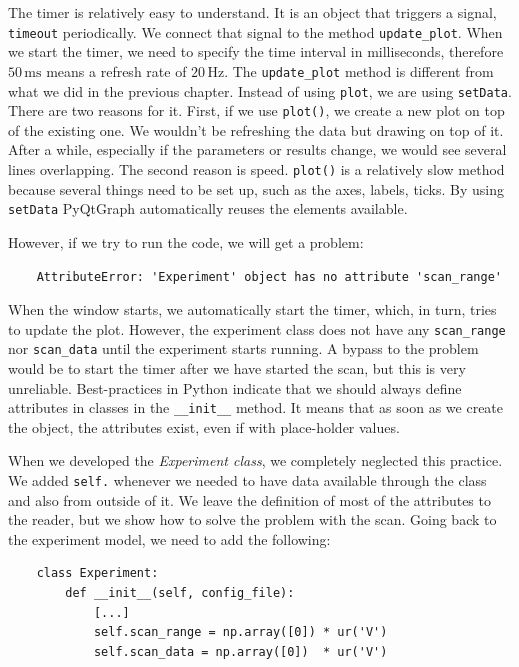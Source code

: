 The timer is relatively easy to understand. It is an object that triggers a signal, \texttt{timeout} periodically. We connect that signal to the method \texttt{update\_plot}. When we start the timer, we need to specify the time interval in milliseconds, therefore $50\,\textrm{ms}$ means a refresh rate of $20\,\textrm{Hz}$. The \texttt{update\_plot} method is different from what we did in the previous chapter. Instead of using \texttt{plot}, we are using \texttt{setData}. There are two reasons for it. First, if we use \texttt{plot()}, we create a new plot on top of the existing one. We wouldn't be refreshing the data but drawing on top of it. After a while, especially if the parameters or results change, we would see several lines overlapping. The second reason is speed. \texttt{plot()} is a relatively slow method because several things need to be set up, such as the axes, labels, ticks. By using \texttt{setData} PyQtGraph automatically reuses the elements available.

However, if we try to run the code, we will get a problem:

\begin{verbatim}
    AttributeError: 'Experiment' object has no attribute 'scan_range'
\end{verbatim}


When the window starts, we automatically start the timer, which, in turn, tries to update the plot. However, the experiment class does not have any \texttt{scan\_range} nor \texttt{scan\_data} until the experiment starts running. A bypass to the problem would be to start the timer after we have started the scan, but this is very unreliable. Best-practices in Python indicate that we should always define attributes in classes in the \texttt{\_\_init\_\_} method. It means that as soon as we create the object, the attributes exist, even if with place-holder values.

When we developed the \emph{Experiment class}, we completely neglected this practice. We added \texttt{self.} whenever we needed to have data available through the class and also from outside of it. We leave the definition of most of the attributes to the reader, but we show how to solve the problem with the scan. Going back to the experiment model, we need to add the following:

\begin{verbatim}
    class Experiment:
        def __init__(self, config_file):
            [...]
            self.scan_range = np.array([0]) * ur('V')
            self.scan_data = np.array([0])  * ur('V')
\end{verbatim}

